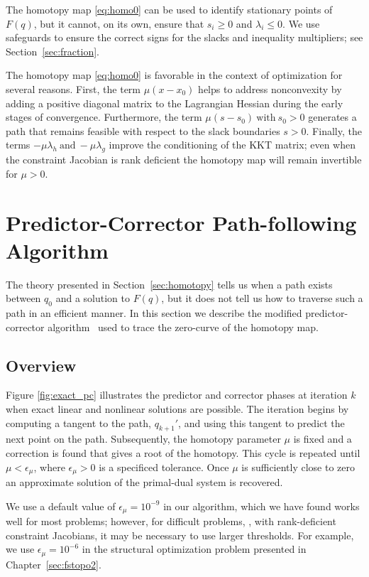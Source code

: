 \begin{remark}
  The homotopy map \eqref{eq:homo0} can be used to identify stationary points of
  $F(q)$, but it cannot, on its own, ensure that $s_i \geq 0$ and $\lambda_{i}
  \leq 0$.  We use safeguards to ensure the correct signs for the slacks and
  inequality multipliers; see Section~\ref{sec:fraction}.
\end{remark}

The homotopy map \eqref{eq:homo0} is favorable in the context of optimization
for several reasons.  First, the term $\mu(x-x_0)$ helps to address nonconvexity
by adding a positive diagonal matrix to the Lagrangian Hessian during the early
stages of convergence.  Furthermore, the term $\mu(s - s_0) \ \text{with} \ s_0 > 0$ generates a path
that remains feasible with respect to the slack boundaries $s>0$.  Finally, the
terms $-\mu\lambda_{h} \ \text{and} \ -\mu\lambda_{g}$ improve the conditioning of the
KKT matrix; even when the constraint Jacobian is rank deficient the homotopy map
will remain invertible for $\mu > 0$.

\section{Predictor-Corrector Path-following Algorithm}\label{sec:pc}
The theory presented in Section~\ref{sec:homotopy} tells us when a path exists
between $q_0$ and a solution to $F(q)$, but it does not tell us how to traverse
such a path in an efficient manner.  In this section we describe the modified
predictor-corrector algorithm~\cite{allgower_georg_1993} used to trace the
zero-curve of the homotopy map.

\subsection{Overview}

Figure \ref{fig:exact_pc}  illustrates the predictor and corrector phases at iteration
$k$ when exact linear and nonlinear solutions are possible.  
The iteration begins by computing a tangent to the path,
$q_{k+1}'$, and using this tangent to predict the next point on the path.
Subsequently, the homotopy parameter $\mu$ is fixed and a correction is found
that gives a root of the homotopy.  This cycle is repeated until $\mu <
\epsilon_\mu$, where $\epsilon_\mu > 0$ is a specificed tolerance.  Once $\mu$ is
sufficiently close to zero an approximate solution of the primal-dual system is
recovered.

\begin{remark}
  We use a default value of $\epsilon_\mu = 10^{-9}$ in our algorithm, which we
  have found works well for most problems; however, for difficult problems, \eg,
  with rank-deficient constraint Jacobians, it may be necessary to use larger
  thresholds.  For example, we use $\epsilon_\mu = 10^{-6}$ in the structural
  optimization problem presented in Chapter~\ref{sec:fstopo2}.
\end{remark}

